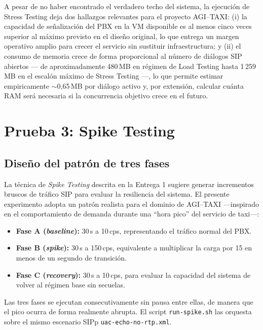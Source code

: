 \documentclass[conference]{IEEEtran}
\begin{document}
A pesar de no haber encontrado el verdadero techo del sistema, la
ejecuci\'on de Stress Testing deja dos hallazgos relevantes para el
proyecto AGI--TAXI: (i) la capacidad de se\~nalizaci\'on del PBX en la
VM disponible es al menos cinco veces superior al m\'aximo previsto
en el dise\~no original, lo que entrega un margen operativo amplio
para crecer el servicio sin sustituir infraestructura; y (ii) el
consumo de memoria crece de forma proporcional al n\'umero de
di\'alogos SIP abiertos --- de aproximadamente 480\,MB en r\'egimen de
Load Testing hasta 1\,259\,MB en el escal\'on m\'aximo de Stress
Testing ---, lo que permite estimar empiricamente $\sim$0{,}65\,MB por
di\'alogo activo y, por extensi\'on, calcular cu\'anta RAM ser\'a
necesaria si la concurrencia objetivo crece en el futuro.

\FloatBarrier
\section{Prueba 3: Spike Testing}
\label{sec:spike}

\subsection{Dise\~no del patr\'on de tres fases}

La t\'ecnica de \textit{Spike Testing} descrita en la Entrega 1 sugiere
generar incrementos bruscos de tr\'afico SIP para evaluar la
resiliencia del sistema. El presente experimento adopta un patr\'on
realista para el dominio de AGI--TAXI ---inspirado en el comportamiento
de demanda durante una ``hora pico'' del servicio de taxi---:

\begin{itemize}
    \item \textbf{Fase A (\textit{baseline}):} 30\,s a 10\,cps,
    representando el tr\'afico normal del PBX.
    \item \textbf{Fase B (\textit{spike}):} 30\,s a 150\,cps, equivalente
    a multiplicar la carga por 15 en menos de un segundo de transici\'on.
    \item \textbf{Fase C (\textit{recovery}):} 30\,s a 10\,cps,
    para evaluar la capacidad del sistema de volver al r\'egimen
    base sin secuelas.
\end{itemize}

Las tres fases se ejecutan consecutivamente sin pausa entre ellas, de
manera que el pico ocurra de forma realmente abrupta. El script
\texttt{run-spike.sh} las orquesta sobre el mismo escenario SIPp
\texttt{uac-echo-no-rtp.xml}.
\end{document}

